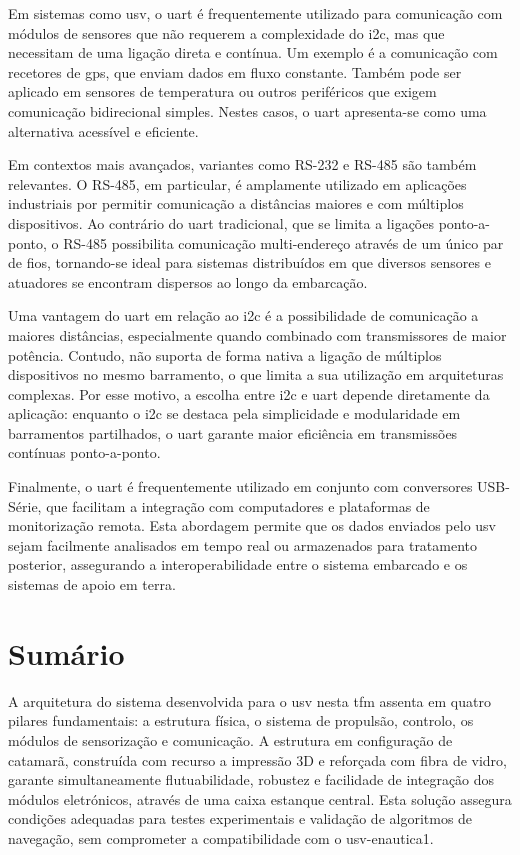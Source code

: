 Em sistemas como \gls{usv}, o \gls{uart} é frequentemente utilizado para comunicação com módulos de sensores que não requerem a complexidade do \gls{i2c}, mas que necessitam de uma ligação direta e contínua. Um exemplo é a comunicação com recetores de \gls{gps}, que enviam dados em fluxo constante. Também pode ser aplicado em sensores de temperatura ou outros periféricos que exigem comunicação bidirecional simples. Nestes casos, o \gls{uart} apresenta-se como uma alternativa acessível e eficiente.

Em contextos mais avançados, variantes como RS-232 e RS-485 são também relevantes. O RS-485, em particular, é amplamente utilizado em aplicações industriais por permitir comunicação a distâncias maiores e com múltiplos dispositivos. Ao contrário do \gls{uart} tradicional, que se limita a ligações ponto-a-ponto, o RS-485 possibilita comunicação multi-endereço através de um único par de fios, tornando-se ideal para sistemas distribuídos em que diversos sensores e atuadores se encontram dispersos ao longo da embarcação.

Uma vantagem do \gls{uart} em relação ao \gls{i2c} é a possibilidade de comunicação a maiores distâncias, especialmente quando combinado com transmissores de maior potência. Contudo, não suporta de forma nativa a ligação de múltiplos dispositivos no mesmo barramento, o que limita a sua utilização em arquiteturas complexas. Por esse motivo, a escolha entre \gls{i2c} e \gls{uart} depende diretamente da aplicação: enquanto o \gls{i2c} se destaca pela simplicidade e modularidade em barramentos partilhados, o \gls{uart} garante maior eficiência em transmissões contínuas ponto-a-ponto.

Finalmente, o \gls{uart} é frequentemente utilizado em conjunto com conversores USB-Série, que facilitam a integração com computadores e plataformas de monitorização remota. Esta abordagem permite que os dados enviados pelo \gls{usv} sejam facilmente analisados em tempo real ou armazenados para tratamento posterior, assegurando a interoperabilidade entre o sistema embarcado e os sistemas de apoio em terra.


\section{Sumário}

A arquitetura do sistema desenvolvida para o \gls{usv} nesta \gls{tfm} assenta em quatro pilares fundamentais: a estrutura física, o sistema de propulsão, controlo, os módulos de sensorização e comunicação. A estrutura em configuração de catamarã, construída com recurso a impressão 3D e reforçada com fibra de vidro, garante simultaneamente flutuabilidade, robustez e facilidade de integração dos módulos eletrónicos, através de uma caixa estanque central. Esta solução assegura condições adequadas para testes experimentais e validação de algoritmos de navegação, sem comprometer a compatibilidade com o \gls{usv}-enautica1.

